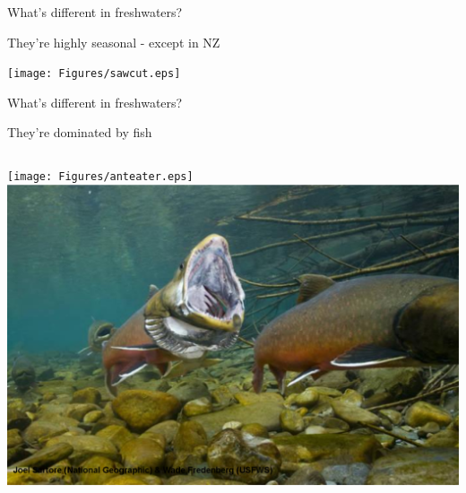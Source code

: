 \documentclass{beamer}
\begin{document}
  \begin{frame}{What's different in freshwaters?}
    \begin{block}{They're highly seasonal - except in NZ}

      \begin{center}

        \texttt{[image: Figures/sawcut.eps]}

      \end{center}
    \end{block}
  \end{frame}

  \begin{frame}{What's different in freshwaters?}
    \begin{block}{They're dominated by fish}

      \begin{columns}
      \column{.5in}
      \column{1.9in}
        \hfill
        \texttt{[image: Figures/anteater.eps]}
      \column{.2in}
      \column{1.9in}
        \includegraphics[width=.8\columnwidth]{Figures/trout.eps}
      \column{.5in}
      \end{columns}
    \end{block}
    
    \vfill

  \end{frame}
\end{document}
